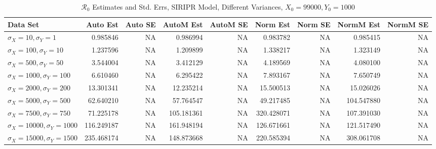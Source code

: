 \documentclass[12pt]{article}
\newcommand{\rr}{\ensuremath{\mathcal{R}_0}}
\begin{document}
\begin{table}[H]
	
	\caption{$\rr$ Estimates and Std. Errs, SIRIPR Model,
		Different Variances, 
		$X_0 = 99000, Y_0 = 1000$}
	\begin{footnotesize}
		\hskip -1.7cm
		\begin{tabular}{l|r|r|r|r|r|r|r|r}
			\hline
			Data Set & Auto Est & Auto SE & AutoM Est & AutoM SE & Norm Est & Norm SE & NormM Est & NormM SE\\
			\hline
			$\sigma_X = 10, \sigma_Y = 1$ & 0.985846 & NA & 0.986994 & NA & 0.983782 & NA & 0.985415 & NA \\
			\hline
			$\sigma_X = 100, \sigma_Y = 10$ & 1.237596 & NA & 1.209899 & NA & 1.338217 & NA & 1.323149 & NA\\
			\hline
			$\sigma_X = 500, \sigma_Y = 50$ & 3.544004 & NA & 3.412129 & NA & 4.189569 & NA & 4.080100 & NA\\
			\hline
			$\sigma_X = 1000, \sigma_Y = 100$ & 6.610460 & NA & 6.295422 & NA & 7.893167 & NA & 7.650749 & NA\\
			\hline
			$\sigma_X = 2000, \sigma_Y = 200$ & 13.301341 & NA & 12.235214 & NA & 15.500513 & NA & 15.026026 & NA\\
			\hline
			$\sigma_X = 5000, \sigma_Y = 500$ & 62.640210 & NA & 57.764547 & NA & 49.217485 & NA & 104.547880 & NA\\
			\hline
			$\sigma_X = 7500, \sigma_Y = 750$ & 71.225178 & NA & 105.181361 & NA & 320.428071 & NA & 107.391030 & NA\\
			\hline
			$\sigma_X = 10000, \sigma_Y = 1000$ & 116.249187 & NA & 161.948194 & NA & 126.671661 & NA & 121.517490 & NA \\
			\hline
			$\sigma_X = 15000, \sigma_Y = 1500$ & 235.468174 & NA & 148.873668 & NA & 220.585394 & NA & 308.061708 & NA\\
			\hline
		\end{tabular}
	\end{footnotesize}
\end{table}
\end{document}
